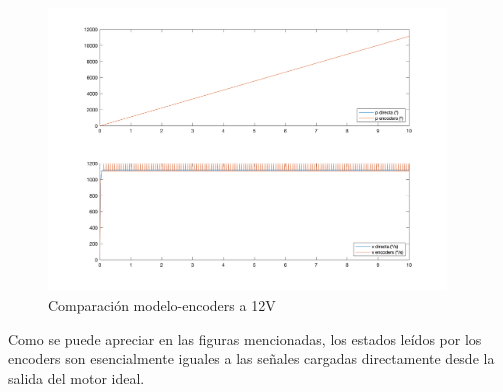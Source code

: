 \documentclass[a4paper, 12pt]{article}
\begin{document}
\begin{figure}[H]
	\centering
	\includegraphics[height=7.5cm]{figs/p3/directaencoder12V}
	\caption{Comparación modelo-encoders a 12V}  \label{encompleto12}
\end{figure}

Como se puede apreciar en las figuras mencionadas, los estados leídos por los encoders son esencialmente iguales a las señales cargadas directamente desde la salida del motor ideal. 
\end{document}
